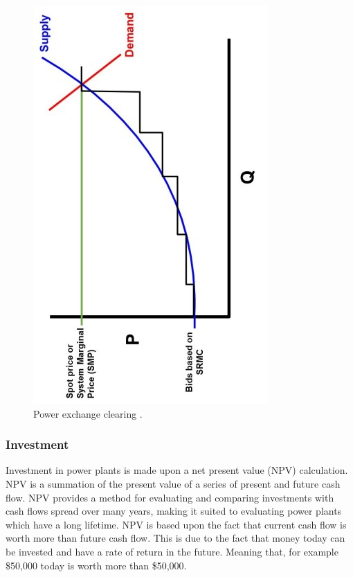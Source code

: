 \begin{figure}
	\centering
	\includegraphics[width=1\linewidth]{figures/power_market}
	\caption{Power exchange clearing \cite{nuclear_economics_consulting_group_2019}.}
	\label{fig:powermarket}
\end{figure}

\subsubsection{Investment}

Investment in power plants is made upon a net present value (NPV) calculation. NPV is a summation of the present value of a series of present and future cash flow. NPV provides a method for evaluating and comparing investments with cash flows spread over many years, making it suited to evaluating power plants which have a long lifetime. NPV is based upon the fact that current cash flow is worth more than future cash flow. This is due to the fact that money today can be invested and have a rate of return in the future. Meaning that, for example \$50,000 today is worth more than \$50,000. 

